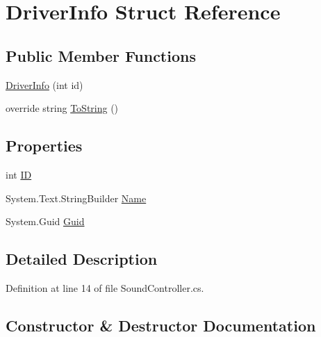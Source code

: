 \hypertarget{struct_driver_info}{}\section{Driver\+Info Struct Reference}
\label{struct_driver_info}
\subsection*{Public Member Functions}
\begin{DoxyCompactItemize}
\item 
\hyperlink{struct_driver_info_a708acddb92fd6934b9602f2f4cae0148}{Driver\+Info} (int id)
\item 
override string \hyperlink{struct_driver_info_a9e6a1cdf1ef4a71e57a7aa0c1fd7aec3}{To\+String} ()
\end{DoxyCompactItemize}
\subsection*{Properties}
\begin{DoxyCompactItemize}
\item 
int \hyperlink{struct_driver_info_a89242d1b1bff9e67bfc924bfddbecae8}{ID}
\item 
System.\+Text.\+String\+Builder \hyperlink{struct_driver_info_a1d9ed2dced2e3d836bd6f92cf3bd3e25}{Name}
\item 
System.\+Guid \hyperlink{struct_driver_info_aeeeab2b74fdfbe1123cef0ed1d931145}{Guid}
\end{DoxyCompactItemize}


\subsection{Detailed Description}


Definition at line 14 of file Sound\+Controller.\+cs.



\subsection{Constructor \& Destructor Documentation}
\mbox{\label{struct_driver_info_a708acddb92fd6934b9602f2f4cae0148}} 
